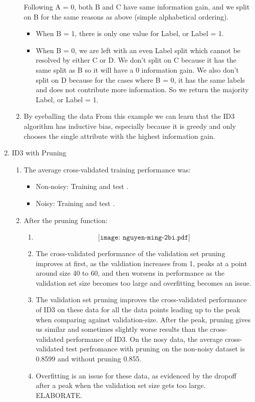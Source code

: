 \documentclass[11pt]{article}
\begin{document}
\begin{enumerate}
\begin{enumerate}
\begin{itemize}
	\end{itemize}
	Following A = 0, both B and C have same information gain, and we split on B for the same reasons as above (simple alphabetical ordering). 
	\begin{itemize}
	\item When B = 1, there is only one value for Label, or Label = 1. 
	\item When B = 0, we are left with an even Label split which cannot be resolved by either C or D. We don't split on C because it has the same split as B so it will have a 0 information gain. We also don't split on D because for the cases where B = 0, it has the same labels and does not contribute more information. So we return the majority Label, or Label = 1.
	\end{itemize}
\item By eyeballing the data  
From this example we can learn that the ID3 algorithm has inductive bias, especially because it is greedy and only chooses the single attribute with the highest information gain. 
\end{enumerate}

\item ID3 with Pruning
\begin{enumerate}
\item The average cross-validated training performance was:
	\begin{itemize}
	\item Non-noisy: Training  and test .
	\item Noisy: Training  and test .
	\end{itemize}
\item After the pruning function:
	\begin{enumerate}
	\item $$\texttt{[image: nguyen-ming-2bi.pdf]}$$
	\item The cross-validated performance of the validation set pruning improves at first, as the valdiation increases from 1, peaks at a point around size 40 to 60, and then worsens in performance as the validation set size becomes too large and overfitting becomes an issue.
	\item The validation set pruning improves the cross-validated performance of ID3 on these data for all the data points leading up to the peak when comparing against validation-size. After the peak, pruning gives us similar and sometimes slightly worse results than the cross-validated performance of ID3. On the nosy data, the average cross-validated test perfromance with pruning on the non-noisy dataset is 0.8599 and without pruning 0.855.
	\item Overfitting is an issue for these data, as evidenced by the dropoff after a peak when the validation set size gets too large. ELABORATE.
	\end{enumerate}
\end{enumerate}


\end{enumerate}
\end{document}
